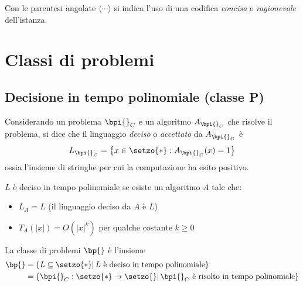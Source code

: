 \begin{definition}
    \label{def:encodingconciso}
    Con le parentesi angolate $\langle \cdots \rangle$ si indica l'uso di una codifica \emph{concisa} e \emph{ragionevole} dell'istanza.
\end{definition}


\section{Classi di problemi}
\label{sse:classidiprob}

\subsection{Decisione in tempo polinomiale (classe P)}

Considerando un problema $\bpi{}_{C}$ e un algoritmo $A_{\bpi{}_{C}}$ che risolve il problema, si dice che il linguaggio \emph{deciso} o \emph{accettato} da $A_{\bpi{}_{C}}$ è
\begin{equation*}
    L_{\bpi{}_{C}} = \left\{ x \in \setzo{*} : A_{\bpi{}_{C}}(x) = 1 \right\}
\end{equation*}
ossia l'insieme di stringhe per cui la computazione ha esito positivo.

\begin{definition}
    \label{def:tempopoli}
    $L$ è deciso in tempo polinomiale se esiste un algoritmo $A$ tale che:
    \begin{itemize}[itemsep=0pt]
        \item $L_A = L$ (il linguaggio deciso da $A$ è $L$)
        \item $T_A(|x|) = O(|x|^k)$ per qualche costante $k \geq 0$
    \end{itemize}
\end{definition}

\begin{definition}[Classe $\bp$]
    \label{def:classep}
    La classe di problemi $\bp{}$ è l'insieme
    \begin{align*}
        \bp{} &= \left\{ L \subseteq \setzo{*} |\, L \text{ è deciso in tempo polinomiale}\right\} \\
        &= \left\{ \bpi{}_{C} : \setzo{*} \to \setzo{} |\, \bpi{}_C \text{ è risolto in tempo polinomiale} \right\}
    \end{align*}
\end{definition}


